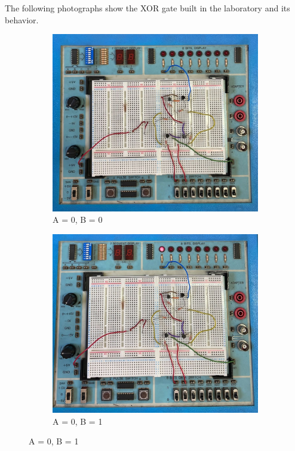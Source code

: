     \noindent
    The following photographs show the XOR gate built in the laboratory and its behavior.
    \begin{figure}[H]
        \centering

        \begin{subfigure}{0.45\textwidth}
            \centering
            \includegraphics[width=\linewidth]{figures/photos/XOR/00.png}
            \caption{A = 0, B = 0}
        \end{subfigure}
        \hfill
        \begin{subfigure}{0.45\textwidth}
            \centering
            \includegraphics[width=\linewidth]{figures/photos/XOR/01.png}
            \caption{A = 0, B = 1}
        \end{subfigure}


\end{figure}
